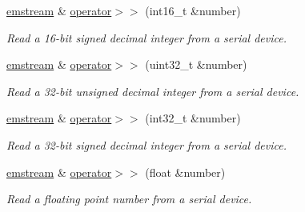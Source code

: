 \begin{DoxyCompactItemize}
\mbox{\hyperlink{classemstream}{emstream}} \& \mbox{\hyperlink{classemstream_a3e646639a87845b68c8f12b1e763a2a2}{operator$>$$>$}} (int16\+\_\+t \&number)
\begin{DoxyCompactList}\small\item\em Read a 16-\/bit signed decimal integer from a serial device. \end{DoxyCompactList}\item 
\mbox{\hyperlink{classemstream}{emstream}} \& \mbox{\hyperlink{classemstream_a52f02a96f606f479538518944a6666e4}{operator$>$$>$}} (uint32\+\_\+t \&number)
\begin{DoxyCompactList}\small\item\em Read a 32-\/bit unsigned decimal integer from a serial device. \end{DoxyCompactList}\item 
\mbox{\hyperlink{classemstream}{emstream}} \& \mbox{\hyperlink{classemstream_ab4e4c0eda7e6f1aabd6f12de6f66f9af}{operator$>$$>$}} (int32\+\_\+t \&number)
\begin{DoxyCompactList}\small\item\em Read a 32-\/bit signed decimal integer from a serial device. \end{DoxyCompactList}\item 
\mbox{\hyperlink{classemstream}{emstream}} \& \mbox{\hyperlink{classemstream_a9f4e98aa62243663dbbc4d1097e17d54}{operator$>$$>$}} (float \&number)
\begin{DoxyCompactList}\small\item\em Read a floating point number from a serial device. \end{DoxyCompactList}\end{DoxyCompactItemize}
